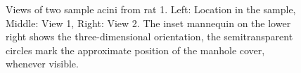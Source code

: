 \documentclass[a4paper,DIV=calc,abstract,english]{scrartcl}
\newlength\imagewidth		%
\newlength\imagescale		%
\begin{document}
\begin{figure}
{%
		}%
	\caption{Views of two sample acini from rat 1. Left: Location in the sample, Middle: View 1, Right: View 2. The inset mannequin on the lower right shows the three-dimensional orientation, the semitransparent circles mark the approximate position of the manhole cover, whenever visible.}
	\label{fig:acini}
\end{figure}
\end{document}
